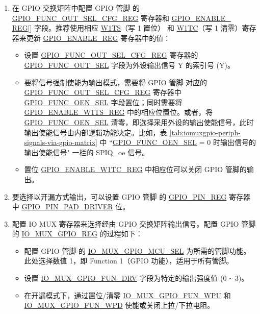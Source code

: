 \documentclass[main\_\_CN.tex]{subfiles}
\begin{document}
\begin{enumerate}
    \item 在 GPIO 交换矩阵中配置 GPIO 管脚  的 \hyperref[regdesc:GPIOFUNCNOUTSELCFGREG]{GPIO\_FUNC\_OUT\_SEL\_CFG\_REG} 寄存器和 \hyperref[regdesc:GPIOENABLEREG]{GPIO\_ENABLE\_\\REG}[] 字段。推荐使用相应 \hyperref[regdesc:GPIOENABLEW1TSREG]{W1TS}（写 1 置位） 和 \hyperref[regdesc:GPIOENABLEW1TCREG]{W1TC}（写 1 清零）寄存器来更新 \hyperref[regdesc:GPIOENABLEREG]{GPIO\_ENABLE\_REG} 寄存器中的值： 
    \begin{itemize}
        \item 设置 \hyperref[regdesc:GPIOFUNCNOUTSELCFGREG]{GPIO\_FUNC\_OUT\_SEL\_CFG\_REG} 寄存器的 \hyperref[fielddesc:GPIOFUNCNOUTSEL]{GPIO\_FUNC\_OUT\_SEL} 字段为外设输出信号 Y 的索引号 (Y)。
        \item 要将信号强制使能为输出模式，需要将 GPIO 管脚   对应的 \hyperref[regdesc:GPIOFUNCNOUTSELCFGREG]{GPIO\_FUNC\_OUT\_SEL\_CFG\_REG} 寄存器中 \hyperref[fielddesc:GPIOFUNCNOENSEL]{GPIO\_FUNC\_OEN\_SEL} 字段置位；同时需要将 \hyperref[regdesc:GPIOENABLEW1TSREG]{GPIO\_ENABLE\_W1TS\_REG} 中的相应位置位。或者，将 \hyperref[fielddesc:GPIOFUNCNOENSEL]{GPIO\_FUNC\_OEN\_SEL} 清零，即选择采用外设的输出使能信号，此时输出使能信号由内部逻辑功能决定。比如，表 \ref{tab:iomuxgpio-periph-signals-via-gpio-matrix} 中 ``\hyperref[fielddesc:GPIOFUNCNOENSEL]{GPIO\_FUNC\_OEN\_SEL} = 0 时输出信号的输出使能信号" 一栏的 SPIQ\_oe 信号。
       \item 置位 \hyperref[regdesc:GPIOENABLEW1TCREG]{GPIO\_ENABLE\_W1TC\_REG} 中相应位可以关闭 GPIO 管脚的输出。
    \end{itemize}
    \item 要选择以开漏方式输出，可以设置 GPIO 管脚  的 \hyperref[regdesc:GPIOPINNREG]{GPIO\_PIN\_REG} 寄存器中 \hyperref[fielddesc:GPIOPINNPADDRIVER]{GPIO\_PIN\_PAD\_DRIVER} 位。
    \item 配置 IO MUX 寄存器来选择经由 GPIO 交换矩阵输出信号。配置 GPIO 管脚  的 \hyperref[regdesc:IOMUXGPIONREG]{IO\_MUX\_GPIO\_REG} 的过程如下：
    \begin{itemize}
        \item 配置 GPIO 管脚  的 \hyperref[fielddesc:IOMUXGPIONMCUSEL]{IO\_MUX\_GPIO\_MCU\_SEL} 为所需的管脚功能。此处选择数值 1，即 Function 1（GPIO 功能），适用于所有管脚。
        \item 设置 \hyperref[fielddesc:IOMUXGPIONFUNDRV]{IO\_MUX\_GPIO\_FUN\_DRV} 字段为特定的输出强度值 (0 \verb+~+ 3)。
        \item 在开漏模式下，通过置位/清零 \hyperref[fielddesc:IOMUXGPIONFUNWPU]{IO\_MUX\_GPIO\_FUN\_WPU} 和 \hyperref[fielddesc:IOMUXGPIONFUNWPD]{IO\_MUX\_GPIO\_FUN\_WPD} 使能或关闭上拉/下拉电阻。
    \end{itemize}
\end{enumerate}
\end{document}
